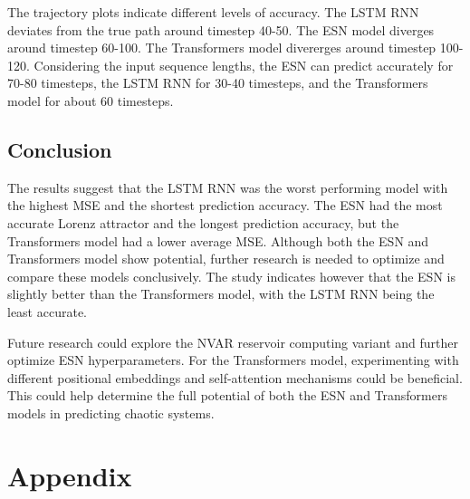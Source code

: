 \documentclass[11pt]{article}
\begin{document}
The trajectory plots indicate different levels of accuracy. The LSTM RNN deviates from the true path around timestep 40-50. The ESN model diverges around timestep 60-100. The Transformers model divererges around timestep 100-120. Considering the input sequence lengths, the ESN can predict accurately for 70-80 timesteps, the LSTM RNN for 30-40 timesteps, and the Transformers model for about 60 timesteps.

\subsection{Conclusion}
The results suggest that the LSTM RNN was the worst performing model with the highest MSE and the shortest prediction accuracy. The ESN had the most accurate Lorenz attractor and the longest prediction accuracy, but the Transformers model had a lower average MSE. Although both the ESN and Transformers model show potential, further research is needed to optimize and compare these models conclusively. The study indicates however that the ESN is slightly better than the Transformers model, with the LSTM RNN being the least accurate.

Future research could explore the NVAR reservoir computing variant and further optimize ESN hyperparameters. For the Transformers model, experimenting with different positional embeddings and self-attention mechanisms could be beneficial. This could help determine the full potential of both the ESN and Transformers models in predicting chaotic systems.




\appendix
\section*{Appendix}
\end{document}
